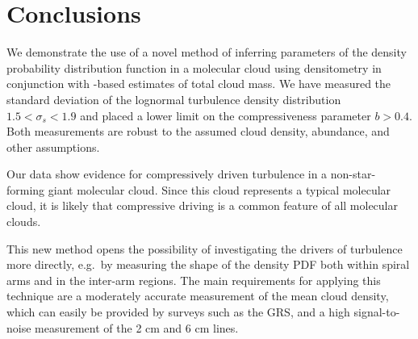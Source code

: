 

\section{Conclusions}
We demonstrate the use of a novel method of inferring parameters of the density
probability distribution function in a molecular cloud using \formaldehyde densitometry
in conjunction with \thirteenco-based estimates of total cloud mass.  We have
measured the standard deviation of the lognormal turbulence density
distribution $1.5 < \sigma_s < 1.9$ and placed a lower limit on the
compressiveness parameter $b>0.4$.  Both measurements are robust to the assumed
cloud density, \formaldehyde abundance, and other assumptions.

Our data show evidence for compressively driven turbulence in a
non-star-forming giant molecular cloud.  Since this cloud represents a typical
molecular cloud, it is likely that compressive driving is a common feature of
all molecular clouds.

This new method opens the possibility of investigating the drivers of
turbulence more directly, e.g.\ by measuring the shape of the density PDF both
within spiral arms and in the inter-arm regions.  The main requirements for
applying this technique are a moderately accurate measurement of the mean cloud
density, which can easily be provided by \thirteenco surveys such as the GRS,
and a high signal-to-noise measurement of the 2 cm and 6 cm \formaldehyde
lines.  


